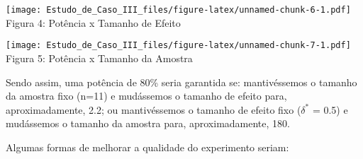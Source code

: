 \documentclass[]{article}
\newenvironment{Shaded}{\begin{snugshade}}{\end{snugshade}}
\newcommand{\KeywordTok}[1]{\textcolor[rgb]{0.13,0.29,0.53}{\textbf{{#1}}}}
\newcommand{\DataTypeTok}[1]{\textcolor[rgb]{0.13,0.29,0.53}{{#1}}}
\newcommand{\DecValTok}[1]{\textcolor[rgb]{0.00,0.00,0.81}{{#1}}}
\newcommand{\FloatTok}[1]{\textcolor[rgb]{0.00,0.00,0.81}{{#1}}}
\newcommand{\StringTok}[1]{\textcolor[rgb]{0.31,0.60,0.02}{{#1}}}
\newcommand{\CommentTok}[1]{\textcolor[rgb]{0.56,0.35,0.01}{\textit{{#1}}}}
\newcommand{\OtherTok}[1]{\textcolor[rgb]{0.56,0.35,0.01}{{#1}}}
\newcommand{\NormalTok}[1]{{#1}}
\begin{document}
\texttt{[image: Estudo\_de\_Caso\_III\_files/figure-latex/unnamed-chunk-6-1.pdf]}
Figura 4: Potência x Tamanho de Efeito

\begin{Shaded}
\end{Shaded}

\texttt{[image: Estudo\_de\_Caso\_III\_files/figure-latex/unnamed-chunk-7-1.pdf]}
Figura 5: Potência x Tamanho da Amostra

\quad Sendo assim, uma potência de 80\% seria garantida se:
mantivéssemos o tamanho da amostra fixo (n=11) e mudássemos o tamanho de
efeito para, aproximadamente, 2.2; ou mantivéssemos o tamanho de efeito
fixo ($\delta^{*}$ = 0.5) e mudássemos o tamanho da amostra para,
aproximadamente, 180.

\quad Algumas formas de melhorar a qualidade do experimento seriam:
\end{document}
